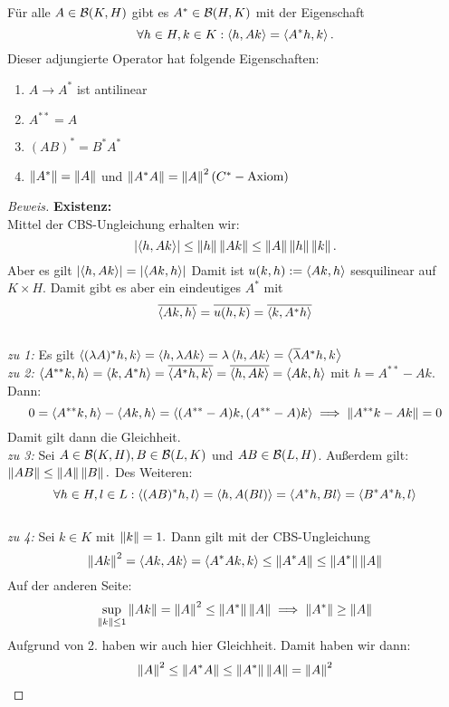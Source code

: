 \begin{theorem}
	Für alle $A \in \B(K, H)$ gibt es $A^* \in \B(H, K)$ mit der Eigenschaft \[\forall h \in H, k \in K: \ip{h, Ak} = \ip{A^*h, k}.\] Dieser adjungierte Operator hat folgende Eigenschaften:

	\begin{enumerate}
		\item $A \to A^*$ ist antilinear
		\item $A^{**} = A$
		\item $(AB)^{*} = B^*A^*$
		\item $\norm{A^*} = \norm{A}$ und $\norm{A^*A} = \norm{A}^2 (C^*-\text{Axiom})$
	\end{enumerate}

	\begin{proof}[Beweis] \textbf{Existenz:} \\
		Mittel der CBS-Ungleichung erhalten wir: \[\ab{\ip{h, Ak}} \leq \norm{h}\norm{Ak} \leq \norm{A}\norm{h}\norm{k}.\] Aber es gilt $\ab{\ip{h, Ak}} = \ab{\ip{Ak, h}} $ Damit ist $u(k, h) := \ip{Ak, h}$ sesquilinear auf $K \times H.$ Damit gibt es aber ein eindeutiges $A^*$ mit \[\overline{\ip{Ak, h}} = \overline{u(h, k)} = \overline{\ip{k, A^*h}}\] \\
\textit{zu 1:} Es gilt \(\ip{(\lambda A)^*h, k} = \ip{h, \lambda A k} = \lambda \ip{h, Ak}= \ip{\overline{\lambda}A^*h, k}\)\\
\textit{zu 2:} \(\ip{A^{**}k, h} = \ip{k, A^*h} = \overline{\ip{A^{*}h, k}} = \overline{{\ip{h, Ak}}} = \ip{Ak, h}\) mit $h = A^{**}-Ak.$ Dann: \[0 = \ip{A^{**}k, h} - \ip{Ak, h} = \ip{(A^{**}-A)k, (A^{**}-A)k} \implies \norm{A^{**}k - Ak} = 0\] Damit gilt dann die Gleichheit. \\
	\textit{zu 3:} Sei $A \in \B(K, H), B \in \B(L, K)$ und $AB \in \B(L, H)$. Außerdem gilt: $\norm{AB} \leq \norm{A}\norm{B}.$ Des Weiteren: \[\forall h \in H, l \in L: \ip{(AB)^*h, l}= \ip{h, A(Bl)} = \ip{A^*h, Bl} = \ip{B^*A^*h, l}\] \\
	\textit{zu 4:} Sei $k \in K$ mit $\norm{k} = 1.$ Dann gilt mit der CBS-Ungleichung \[\norm{Ak}^2 = \ip{Ak, Ak} = \ip{A^*Ak, k} \leq \norm{A^*A} \leq \norm{A^*} \norm{A}\]
Auf der anderen Seite: \[ \sup_{\norm{k} \leq 1} \norm{Ak} = \norm{A}^2 \leq \norm{A^*} \norm{A} \implies \norm{A^*} \geq \norm{A}\] Aufgrund von 2. haben wir auch hier Gleichheit. Damit haben wir dann: \[\norm{A}^2 \leq \norm{A^*A} \leq \norm{A^*}\norm{A} = \norm{A}^2\]
\end{proof}
\end{theorem}


